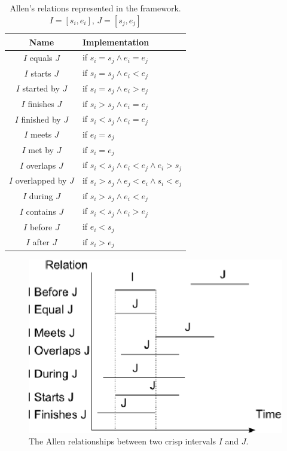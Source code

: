 \begin{table}[h]
\centering
\begin{tabular}{|c|l|}
\hline
Name & Implementation \\ \hline 
$I$ equals $J$ & if $s_i = s_j \wedge e_i = e_j $ \\
$I$ starts $J$ & if $s_i = s_j \wedge e_i < e_j $ \\
$I$ started by $J$ & if $s_i = s_j \wedge e_i > e_j $ \\
$I$ finishes $J$ & if $s_i > s_j \wedge e_i = e_j $ \\
$I$ finished by $J$ & if $s_i < s_j \wedge e_i = e_j $ \\
$I$ meets $J$ & if $e_i = s_j $ \\
$I$ met by $J$ & if $s_i = e_j $ \\
$I$ overlaps $J$ & if $s_i < s_j \wedge e_i < e_j \wedge e_i > s_j $ \\
$I$ overlapped by $J$ & if $s_i > s_j \wedge e_j < e_i \wedge s_i < e_j  $ \\
$I$ during $J$ & if $s_i > s_j \wedge e_i < e_j $ \\
$I$ contains $J$ & if $  s_i < s_j \wedge e_i > e_j$ \\
$I$ before $J$ & if $e_i < s_j $ \\
$I$ after $J$ & if $s_i > e_j $ \\
\hline
\end{tabular}
\caption{Allen's relations represented in the framework. $I = \left[s_i, e_i\right]$, $J=  \left[s_j, e_j\right]$}
\label{tab:allen-relations}
\end{table}


\begin{figure}[h]
   \centering
   \includegraphics[width=0.8\columnwidth]{graphs/allen.eps}
   \caption{The Allen relationships between two crisp intervals $I$ and $J$.  }
   \label{fig:allen-relationships}
 \end{figure}
